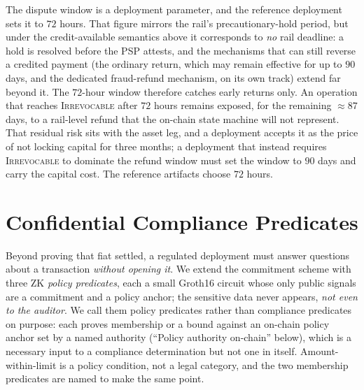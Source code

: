 \documentclass[11pt]{article}
\begin{document}
The dispute window is a deployment parameter, and the reference deployment sets
it to $72$ hours. That figure mirrors the rail's precautionary-hold period, but
under the credit-available semantics above it corresponds to \emph{no} rail
deadline: a hold is resolved before the PSP attests, and the mechanisms that can
still reverse a credited payment (the ordinary return, which may remain
effective for up to $90$ days, and the dedicated fraud-refund mechanism, on its
own track) extend far beyond it. The $72$-hour window therefore catches early
returns only. An operation that reaches \textsc{Irrevocable} after $72$ hours
remains exposed, for the remaining $\approx 87$ days, to a rail-level refund
that the on-chain state machine will not represent. That residual risk sits with
the asset leg, and a deployment accepts it as the price of not locking capital
for three months; a deployment that instead requires \textsc{Irrevocable} to
dominate the refund window must set the window to $90$ days and carry the
capital cost. The reference artifacts choose $72$ hours.

\section{Confidential Compliance Predicates}
\label{sec:predicates}

Beyond proving that fiat settled, a regulated deployment must answer questions
about a transaction \emph{without opening it}. We extend the commitment scheme
with three ZK \emph{policy predicates}, each a small Groth16 circuit whose only
public signals are a commitment and a policy anchor; the sensitive data never
appears, \emph{not even to the auditor}. We call them policy predicates rather
than compliance predicates on purpose: each proves membership or a bound against
an on-chain policy anchor set by a named authority (``Policy authority
on-chain'' below), which is a necessary input to a compliance determination but
not one in itself. Amount-within-limit is a policy condition, not a legal
category, and the two membership predicates are named to make the same point.
\end{document}
